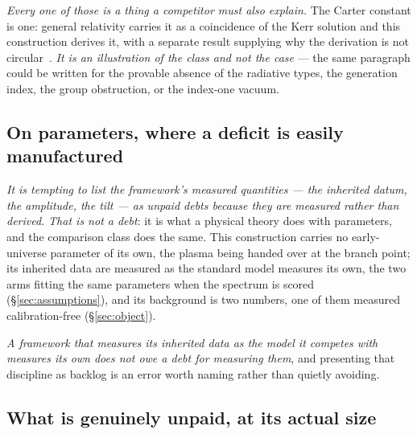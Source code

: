 \documentclass[11pt,a4paper]{article}
\theoremstyle{plain}
\theoremstyle{definition}
\begin{document}
\emph{Every one of those is a thing a competitor must also explain.} The Carter constant is one: general
relativity carries it as a coincidence of the Kerr solution and this construction derives it, with a separate
result supplying why the derivation is not circular~\cite{JanzenRange}. \emph{It is an illustration of the
class and not the case} --- the same paragraph could be written for the provable absence of the radiative
types, the generation index, the group obstruction, or the index-one vacuum.

\subsection{On parameters, where a deficit is easily manufactured}

\emph{It is tempting to list the framework's measured quantities --- the inherited datum, the amplitude, the
tilt --- as unpaid debts because they are measured rather than derived.} \emph{That is not a debt}: it is
what a physical theory does with parameters, and the comparison class does the same. This
construction carries no early-universe parameter of its own, the plasma being handed over at the branch point;
its inherited data are measured as the standard model measures its own, the two arms fitting the same
parameters when the spectrum is scored (\S\ref{sec:assumptions}), and its background is two numbers, one of
them measured calibration-free (\S\ref{sec:object}).

\emph{A framework that measures its inherited data as the model it competes with measures its own does not
owe a debt for measuring them}, and presenting that discipline as backlog is an error worth naming rather than
quietly avoiding.

\subsection{What is genuinely unpaid, at its actual size}
\end{document}
